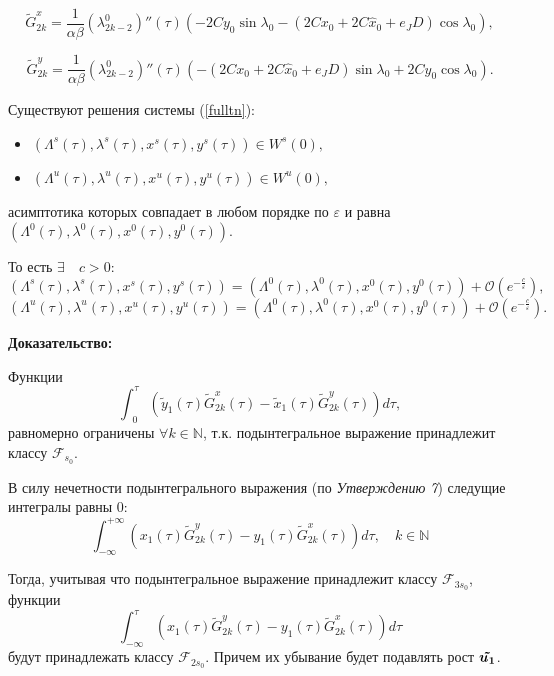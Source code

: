 $$\tilde G_{2k}^x  = \frac{1}{\alpha \beta} (\lambda^0_{2k-2})''(\tau) \left( -2Cy_0 \sin\lambda_0 - (2Cx_0+2C \hat x_0+e_JD) \cos\lambda_0 \right),$$

$$\tilde G_{2k}^y  = \frac{1}{\alpha \beta} (\lambda^0_{2k-2})''(\tau) \left( -(2Cx_0+2C \hat x_0+e_JD) \sin\lambda_0 + 2Cy_0 \cos\lambda_0 \right).$$
\begin{thm}
\begin{samepage}
Существуют решения системы (\ref{fulltn}):
\begin{itemize}
\item $(\Lambda^s(\tau),\lambda^s(\tau),x^s(\tau),y^s(\tau)) \in W^s(0),$
\item $(\Lambda^u(\tau),\lambda^u(\tau),x^u(\tau),y^u(\tau)) \in W^u(0),$
\end{itemize}

асимптотика которых совпадает в любом порядке по $\varepsilon$ и равна $(\Lambda^0(\tau),\lambda^0(\tau),x^0(\tau),y^0(\tau))$.
\end{samepage}
То есть $\exists \quad c>0:$
$$(\Lambda^s(\tau),\lambda^s(\tau),x^s(\tau),y^s(\tau)) = (\Lambda^0(\tau),\lambda^0(\tau),x^0(\tau),y^0(\tau)) + \mathcal{O}(e^{-\frac{c}{\varepsilon}}),$$
$$(\Lambda^u(\tau),\lambda^u(\tau),x^u(\tau),y^u(\tau)) = (\Lambda^0(\tau),\lambda^0(\tau),x^0(\tau),y^0(\tau)) + \mathcal{O}(e^{-\frac{c}{\varepsilon}}).$$

\end{thm}
\textbf{Доказательство:}\nopagebreak[4]

Функции 
$$\int_{\text{ } 0}^\tau \left( \tilde y_1(\tau) \tilde G_{2k}^x(\tau) - \tilde x_1(\tau) \tilde G_{2k}^y(\tau) \right) d \tau,$$
равномерно ограничены $\forall k \in \mathbb{N}$, т.к. подынтегральное выражение принадлежит классу $\mathcal{F}_{s_0}$.

В силу нечетности подынтегрального выражения (по \textit{Утверждению 7}) следущие интегралы равны 0:
$$\int_{-\infty}^{+\infty} \left( x_1(\tau) \tilde G_{2k}^y(\tau) - y_1(\tau) \tilde G_{2k}^x(\tau) \right) d \tau, \quad k \in \mathbb{N}$$

Тогда, учитывая что подынтегральное выражение принадлежит классу $\mathcal{F}_{3s_0}$, функции
$$\int_{-\infty}^{\tau} \left( x_1(\tau) \tilde G_{2k}^y(\tau) - y_1(\tau) \tilde G_{2k}^x(\tau) \right) d \tau$$
будут принадлежать классу $\mathcal{F}_{2s_0}$. Причем их убывание будет подавлять рост $\boldsymbol{ \tilde{u_1}}$.

